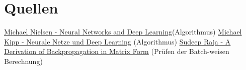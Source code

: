 \documentclass{article}
\begin{document}
\section{Quellen}
\href{http://neuralnetworksanddeeplearning.com}{Michael Nielsen - Neural Networks and Deep Learning}(Algorithmus) \linebreak
\href{https://michaelkipp.de/deeplearning}{Michael Kipp - Neurale Netze und Deep Learning} (Algorithmus) \linebreak
\href{https://sudeepraja.github.io/Neural/}{Sudeep Raja - A Derivation of Backpropagation in Matrix Form} (Prüfen der Batch-weisen Berechnung)
\end{document}
